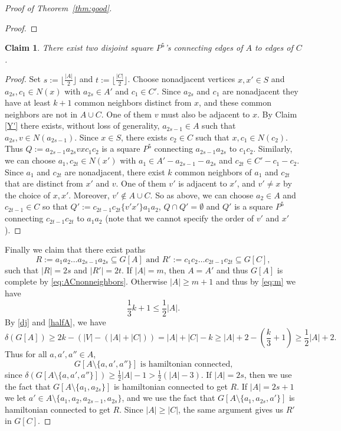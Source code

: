 \documentclass[oneside,12pt]{memoir}
\newtheorem{claim}[theorem]{Claim}
\begin{document}
\begin{proof}[Proof of Theorem~\ref{thm:good}]
\begin{proof}
\end{proof}

\begin{claim}
There exist two disjoint square $P^{5}$'s connecting edges of $A$ to edges of $C$.\label{con}
\end{claim}

\begin{proof}
Set $s:=\lfloor\frac{|A|}{2}\rfloor$ and $t:=\lfloor\frac{|C|}{2}\rfloor$.
Choose nonadjacent vertices $x,x'\in S$ and $a_{2s},c_{1}\in N(x)$
with $a_{2s}\in A'$ and $c_{1}\in C'$. Since $a_{2s}$ and $c_{1}$
are nonadjacent they have at least $k+1$ common neighbors distinct
from $x$, and these common neighbors are not in $A\cup C$. One of
them $v$ must also be adjacent to $x$. By Claim \ref{Y'} there exists, without loss of generality, $a_{2s-1}\in A$ such that $a_{2s},v\in N(a_{2s-1})$.  
Since $x\in S$, there exists $c_{2}\in C$ such that $x,c_{1}\in N(c_{2})$. Thus
$Q:=a_{2s-1}a_{2s}vxc_{1}c_{2}$ is a square $P^{5}$ connecting $a_{2s-1}a_{2s}$
to $c_{1}c_{2}$. Similarly, we can choose $a_{1},c_{2t}\in N(x')$
with $a_{1}\in A'-a_{2s-1}-a_{2s}$ and $c_{2t}\in C'-c_{1}-c_{2}$.
Since $a_{1}$ and $c_{2t}$ are nonadjacent, there exist $k$ common
neighbors of $a_{1}$ and $c_{2t}$ that are distinct from $x'$ and
$v$. One of them $v'$ is adjacent to $x'$, and $v'\ne x$ by the
choice of $x,x'$. Moreover, $v'\notin A\cup C$. So as above, we can choose $a_{2}\in A$ and $c_{2t-1}\in C$ so that
$Q':=c_{2t-1}c_{2t}\{v'x'\}a_{1}a_{2}$, $Q\cap Q'=\emptyset$ and $Q'$ is a square $P^{5}$
connecting $c_{2t-1}c_{2t}$ to $a_{1}a_{2}$ (note that we cannot specify the order of $v'$ and $x'$). 
\end{proof}

Finally we claim that there exist paths $$R:=a_{1}a_{2}\dots a_{2s-1}a_{2s}
\subseteq G[A] \textrm{ and } R':=c_{1}c_{2}\dots c_{2t-1}c_{2t}\subseteq G[C],$$ such that $|R|=2s$ and $|R'|=2t$. If $|A|=m$, then $A=A'$ %
and thus $G[A]$ is complete by \eqref{eq:ACnonneighbors}.
Otherwise $|A|\geq m+1$ and thus by \eqref{eq:m} we have
\begin{equation}\label{halfA}
\frac{1}{3}k+1\leq \frac{1}{2}|A|.
\end{equation}
By \eqref{dj} and \eqref{halfA}, we have 
$$\delta(G[A])\geq 2k-(|V|-(|A|+|C|))=|A|+|C|-k\geq |A|+2-(\frac{k}{3}+1)\geq \frac{1}{2}|A|+2.$$ 
Thus for all $a,a',a''\in A$, 
\begin{equation*}G[A\setminus \{a,a',a''\}]
\text{ is hamiltonian connected,}
\end{equation*} 
since $\delta(G[A\setminus\{a,a',a''\}])\geq \frac{1}{2}|A|-1>\frac{1}{2}(|A|-3)$. If $|A|=2s$, then we use the fact that $G[A\setminus\{a_1,a_{2s}\}]$ is hamiltonian connected to get $R$.  If $|A|=2s+1$ we let $a'\in A\setminus\{a_1,a_2,a_{2s-1}, a_{2s}\}$, and we use the fact that $G[A\setminus\{a_1, a_{2s}, a'\}]$ is hamiltonian connected to get $R$.  Since $|A|\geq |C|$, the same argument gives us $R'$ in $G[C]$. 


\end{proof}
\end{document}
